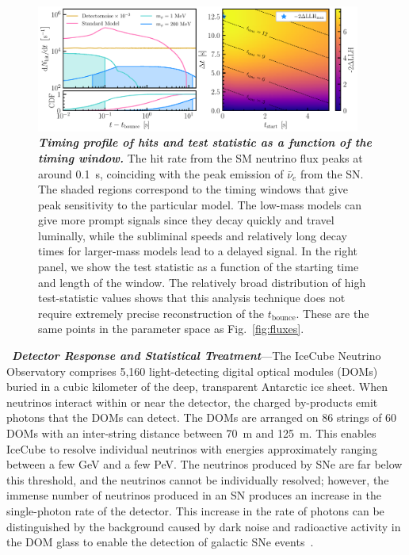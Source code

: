 \begin{figure}[t]
    \centering
    \includegraphics[width=0.95\textwidth]{figures/hits_and_likelihood.pdf}
    \caption{\textbf{\textit{Timing profile of hits and test statistic as a function of the timing window.}}
    The hit rate from the SM neutrino flux peaks at around 0.1~s, coinciding with the peak emission of $\bar{\nu}_{e}$ from the SN.
    The shaded regions correspond to the timing windows that give peak sensitivity to the particular model.
    The low-mass models can give more prompt signals since they decay quickly and travel luminally, while the subliminal speeds and relatively long decay times for larger-mass models lead to a delayed signal.
    In the right panel, we show the test statistic as a function of the starting time and length of the window.
    The relatively broad distribution of high test-statistic values shows that this analysis technique does not require extremely precise reconstruction of the $t_{\mathrm{bounce}}$.
    These are the same points in the parameter space as Fig.~\ref{fig:fluxes}.
    }
    \label{fig:hits_and_likelihood}
\end{figure}
\
\textbf{\textit{Detector Response and Statistical Treatment}}---The IceCube Neutrino Observatory comprises 5,160 light-detecting digital optical modules (DOMs) buried in a cubic kilometer of the deep, transparent Antarctic ice sheet.
When neutrinos interact within or near the detector, the charged by-products emit photons that the DOMs can detect.
The DOMs are arranged on 86 strings of 60 DOMs with an inter-string distance between 70~m and 125~m.
This enables IceCube to resolve individual neutrinos with energies approximately ranging between a few GeV and a few PeV.
The neutrinos produced by SNe are far below this threshold, and the neutrinos cannot be individually resolved; however, the immense number of neutrinos produced in an SN produces an increase in the single-photon rate of the detector.
This increase in the rate of photons can be distinguished by the background caused by dark noise and radioactive activity in the DOM glass to enable the detection of galactic SNe events~\cite{Griswold:2023iwz}.

